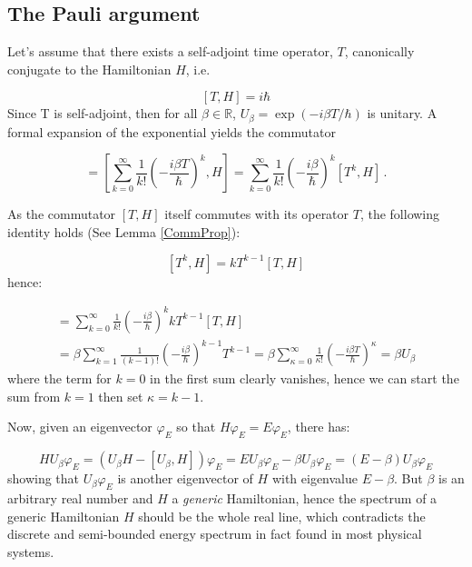 \subsection*{The Pauli argument}

Let's assume that there exists a self-adjoint time operator, $T$, canonically conjugate
to the Hamiltonian $H$, i.e.

\begin{equation}
\label{THcommutator}
[T, H] = i\hbar
\end{equation}
Since T is self-adjoint, then for all
$\beta\in\mathbb{R}$, $U_{\beta} = \exp(- i \beta T / \hbar)$
is unitary. A formal
expansion of the exponential yields the commutator

\begin{equation}
[U_{\beta}, H]  =
\left[
  \sum_{k=0}^{\infty} \frac{1}{k!} \left(- \frac{i\beta T}{\hbar} \right)^k, H
\right]         =
\sum_{k=0}^{\infty} \frac{1}{k!} \left(- \frac{i\beta}{\hbar} \right)^k [T^k, H] \,\text{.}
\end{equation}

As the commutator $[T, H]$ itself commutes with its operator $T$,
the following identity holds (See Lemma \ref{CommProp}):

$$
[T^k, H] = kT^{k-1}[T, H]
$$
hence:

\begin{multline}
[U_{\beta}, H]  =
\sum_{k=0}^{\infty} \frac{1}{k!} \left(- \frac{i\beta}{\hbar} \right)^k kT^{k-1}[T, H] \\ =
\beta\sum_{k=1}^{\infty} \frac{1}{(k-1)!} \left(- \frac{i\beta}{\hbar} \right)^{k-1} T^{k-1} =
\beta\sum_{\kappa=0}^{\infty} \frac{1}{\kappa!} \left(- \frac{i\beta T}{\hbar} \right)^{\kappa}  =
\beta U_{\beta}
\end{multline}
where the term for $k=0$ in the first sum clearly vanishes, hence we can start the sum from
$k=1$ then set $\kappa=k-1$.

Now, given an eigenvector $\varphi_{E}$ so that $H\varphi_{E}=E\varphi_{E}$, there has:

$$
HU_{\beta}\varphi_{E} = (U_{\beta}H - [U_{\beta}, H])\varphi_{E} =
EU_{\beta}\varphi_{E} - \beta U_{\beta}\varphi_{E} = (E-\beta)U_{\beta}\varphi_{E}
$$
showing that $U_{\beta}\varphi_{E}$ is another eigenvector of $H$ with eigenvalue
$E-\beta$. But $\beta$ is an arbitrary real number and $H$ a \emph{generic} Hamiltonian,
hence the spectrum of a generic Hamiltonian $H$ should
be the whole real line, which contradicts the discrete and semi-bounded energy spectrum
in fact found in most physical systems.

